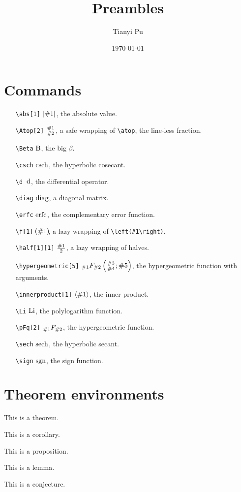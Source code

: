 \documentclass{article}
\title{Preambles}
\author{Tianyi Pu}
\date{\today}
\begin{document}
\maketitle

\section{Commands}
\begin{itemize}
    \item[\texttt{\textbackslash abs[1]}] $\abs{\#1}$, the absolute value.
    \item[\texttt{\textbackslash Atop[2]}] $\Atop{\#1}{\#2}$, a safe wrapping of \texttt{\textbackslash atop}, the line-less fraction.
    \item[\texttt{\textbackslash Beta}] $\Beta$, the big $\beta$.
    \item[\texttt{\textbackslash csch}] $\csch$, the hyperbolic cosecant.
    \item[\texttt{\textbackslash d}] $\d$, the differential operator.
    \item[\texttt{\textbackslash diag}] $\diag$, a diagonal matrix.
    \item[\texttt{\textbackslash erfc}] $\erfc$, the complementary error function.
    \item[\texttt{\textbackslash f[1]}] $\f{\#1}$, a lazy wrapping of \texttt{\textbackslash left(\#1\textbackslash right)}.
    \item[\texttt{\textbackslash half[1][1]}] $\half[\#1]$, a lazy wrapping of halves.
    \item[\texttt{\textbackslash hypergeometric[5]}] $\hypergeometric{\#1}{\#2}{\#3}{\#4}{\#5}$, the hypergeometric function with arguments.
    \item[\texttt{\textbackslash innerproduct[1]}] $\innerproduct{\#1}$, the inner product.
    \item[\texttt{\textbackslash Li}] $\Li$, the polylogarithm function.
    \item[\texttt{\textbackslash pFq[2]}] $\pFq{\#1}{\#2}$, the hypergeometric function.
    \item[\texttt{\textbackslash sech}] $\sech$, the hyperbolic secant.
    \item[\texttt{\textbackslash sign}] $\sign$, the sign function.
\end{itemize}

\section{Theorem environments}
\begin{theorem}
    This is a theorem.
\end{theorem}
\begin{corollary}
    This is a corollary.
\end{corollary}
\begin{proposition}
    This is a proposition.
\end{proposition}
\begin{lemma}
    This is a lemma.
\end{lemma}
\begin{conjecture}
    This is a conjecture.
\end{conjecture}
\end{document}
